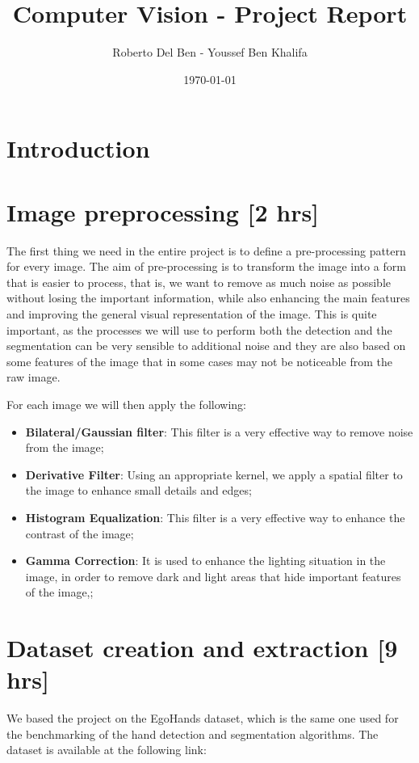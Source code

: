 
\title{Computer Vision - Project Report}
\author{Roberto Del Ben - Youssef Ben Khalifa}
\date{\today}

\maketitle \tableofcontents
\newpage

\section{Introduction}

\section{Image preprocessing [2 hrs]}

The first thing we need in the entire project is to define a pre-processing
pattern for every image. The aim of pre-processing is to transform the image
into a form
that is easier to process, that is, we want to remove as much noise as possible
without losing the important information, while also enhancing the main
features and
improving the general visual representation of the image. This is quite
important, as the processes we will use to perform both the detection and the
segmentation
can be very sensible to additional noise and they are also based on some
features of the image that in some cases may not be noticeable from the raw
image.

For each image we will then apply the following:
\begin{itemize}
    \item \textbf{Bilateral/Gaussian filter}: This filter is a very effective
          way to remove noise from the image;
    \item \textbf{Derivative Filter}: Using an appropriate kernel, we apply a
          spatial filter to the image to enhance small details and edges;
    \item \textbf{Histogram Equalization}: This filter is a very effective way
          to enhance the contrast of the image;
    \item \textbf{Gamma Correction}: It is used to enhance the lighting
          situation in the image, in order to remove dark and light areas that
          hide
          important features of the image,;
\end{itemize}

\section{Dataset creation and extraction [9 hrs]}
We based the project on the EgoHands dataset, which is the same one used for
the benchmarking of the hand detection and segmentation algorithms. The dataset
is available at the following link:

